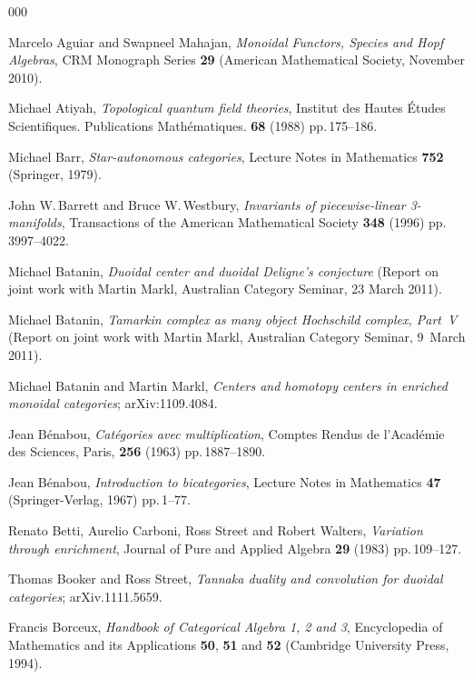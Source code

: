 \documentclass[a4paper,12pt]{article}
\theoremstyle{definition}
\theoremstyle{fact}
\theoremstyle{genquest}
\theoremstyle{step}
\begin{document}
\appendix
\begin{thebibliography}{000}

 Marcelo Aguiar and Swapneel Mahajan, \textit{Monoidal Functors, Species and Hopf Algebras}, CRM Monograph Series \textbf{29} (American Mathematical Society, November 2010).

 Michael Atiyah, \textit{Topological quantum field theories}, Institut des Hautes \'Etudes Scientifiques. Publications Math\'ematiques. \textbf{68} (1988) pp.\,175--186. 

 Michael Barr, \textit{Star-autonomous categories}, Lecture Notes in Mathematics \textbf{752} (Springer, 1979).

 John W.\,Barrett and Bruce W.\,Westbury, \textit{Invariants of piecewise-linear 3-manifolds}, Transactions of the American Mathematical Society \textbf{348} (1996) pp.\,3997--4022.

 Michael Batanin, \textit{Duoidal center and duoidal Deligne's conjecture} (Report on joint work with Martin Markl, Australian Category Seminar, 23 March 2011).

 Michael Batanin, \textit{Tamarkin complex as many object Hochschild complex, Part~V} (Report on joint work with Martin Markl, Australian Category Seminar, 9~March 2011).

 Michael Batanin and Martin Markl, \textit{Centers and homotopy centers in enriched monoidal categories}; arXiv:1109.4084.

 Jean B\'enabou, \textit{Cat\'egories avec multiplication}, Comptes Rendus de l'Acad\'emie des Sciences, Paris, \textbf{256} (1963) pp.\,1887--1890.

 Jean B\'enabou, \textit{Introduction to bicategories}, Lecture Notes in Mathematics \textbf{47} (Springer-Verlag, 1967) pp.\,1--77.

 Renato Betti, Aurelio Carboni, Ross Street and Robert Walters, \textit{Variation through enrichment}, Journal of Pure and Applied Algebra \textbf{29} (1983) pp.\,109--127.

 Thomas Booker and Ross Street, \textit{Tannaka duality and convolution for duoidal categories}; arXiv.1111.5659. 

 Francis Borceux, \textit{Handbook of Categorical Algebra 1, 2 and 3}, Encyclopedia of Mathematics and its Applications \textbf{50}, \textbf{51} and \textbf{52} (Cambridge University Press, 1994).


\end{thebibliography}
\end{document}
